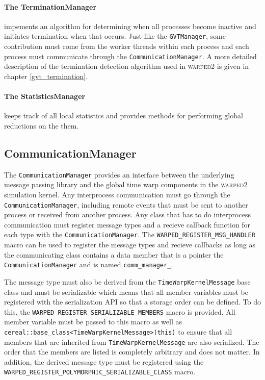 \documentclass[11pt]{book}
\begin{document}
\paragraph{The TerminationManager} impements an algorithm for determining when all processes
become inactive and initiates termination when that occurs. Just like the \texttt{GVTManager},
some contribution must come from the worker threads within each process and each process must
communicate through the \texttt{CommunicationManager}. A more detailed description of the
termination detection algorithm used in \textsc{warped2} is given in chapter \ref{gvt_termination}.

\paragraph{The StatisticsManager} keeps track of all local statistics and provides methods for
performing global reductions on the them. 

\subsection{CommunicationManager}

The \texttt{CommunicationManager} provides an interface between the underlying message passing library
and the global time warp components in the \textsc{warped2} simulation kernel. Any interprocess
communication must go through the \texttt{CommunicationManager}, including remote events that must be
sent to another process or received from another process. Any class that has to do interprocess
communication must register message types and a recieve callback function for each type with
the \texttt{CommunicationManager}. The \texttt{WARPED\_REGISTER\_MSG\_HANDLER} macro can be used
to register the message types and recieve callbacks as long as the communicating class contains
a data member that is a pointer the \texttt{CommunicationManager} and is named \texttt{comm\_manager\_}.

The message type must also be derived from the \texttt{TimeWarpKernelMessage} base class and
must be serializable which means that all member variables must be registered with the serialization
API so that a storage order can be defined. To do this, the \texttt{WARPED\_REGISTER\_SERIALIZABLE\_MEMBERS}
macro is provided. All member variable must be passed to this macro as well as
\texttt{cereal::base\_class<TimeWarpKernelMessage>(this)} to ensure that all members that are
inherited from \texttt{TimeWarpKernelMessage} are also serialized. The order that the members are
listed is completely arbitrary and does not matter. In addition, the derived message type must
be registered using the \texttt{WARPED\_REGISTER\_POLYMORPHIC\_SERIALIZABLE\_CLASS} macro. 
\end{document}
